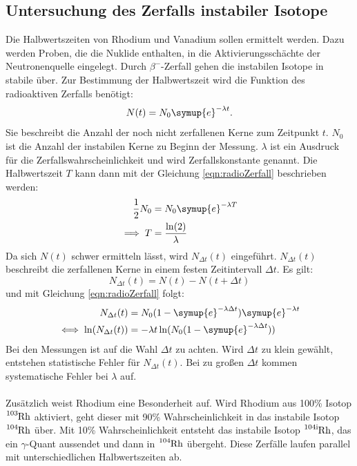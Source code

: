 \subsection{Untersuchung des Zerfalls instabiler Isotope}
Die Halbwertszeiten von Rhodium und Vanadium sollen ermittelt werden.
Dazu werden Proben, die die Nuklide enthalten, in die Aktivierungsschächte der Neutronenquelle eingelegt.
Durch $\beta^-$-Zerfall gehen die instabilen Isotope in stabile über.
Zur Bestimmung der Halbwertszeit wird die Funktion des radioaktiven Zerfalls benötigt:
\begin{equation}\label{eqn:radioZerfall}
    N(t) = N_0 \symup{e} ^{-\lambda t} .
\end{equation}
Sie beschreibt die Anzahl der noch nicht zerfallenen Kerne zum Zeitpunkt $t$.
$N_0$ ist die Anzahl der instabilen Kerne zu Beginn der Messung.
$\lambda$ ist ein Ausdruck für die Zerfallswahrscheinlichkeit und wird Zerfallskonstante genannt.
Die Halbwertszeit $T$ kann dann mit der Gleichung \eqref{eqn:radioZerfall} beschrieben werden:
\begin{align}
    \frac{1}{2} N_0 & = N_0 \symup{e}^{-\lambda T} \\* \label{eqn:halbwertszeit}
    \implies T & = \frac{\ln(2)}{\lambda} 
\end{align}
Da sich $N(t)$ schwer ermitteln lässt, wird $N_{\Delta t}(t)$ eingeführt.
$N_{\Delta t}(t)$ beschreibt die zerfallenen Kerne in einem festen Zeitintervall $\Delta t$.
Es gilt:
\begin{equation*}
    N_{\Delta t}(t) = N(t) - N(t + \Delta t)
\end{equation*}
und mit Gleichung \eqref{eqn:radioZerfall} folgt:
\begin{align*}
    N_{\Delta t}(t) & = N_0 (1 - \symup{e}^{-\lambda\Delta t}) \symup{e}^{-\lambda t}\\
    \iff \ln(N_{\Delta t}(t)) & = -\lambda t \ln(N_0(1 - \symup{e}^{-\lambda\Delta t}))
\end{align*}
Bei den Messungen ist auf die Wahl $\Delta t $ zu achten.
Wird $\Delta t $ zu klein gewählt, entstehen statistische Fehler für $N_{\Delta t}(t)$.
Bei zu großen $\Delta t$ kommen systematische Fehler bei $\lambda$ auf.\\
\\
Zusätzlich weist Rhodium eine Besonderheit auf.
Wird Rhodium aus 100\% Isotop $\ce{^{103}Rh}$ aktiviert, geht dieser mit 90\% Wahrscheinlichkeit in das instabile Isotop $\ce{^{104}Rh}$ über.
Mit 10\% Wahrscheinlichkeit entsteht das instabile Isotop $\ce{^{104\text{i}}Rh}$, das ein $\gamma$-Quant aussendet und dann in $\ce{^{104}Rh}$ übergeht.
Diese Zerfälle laufen parallel mit unterschiedlichen Halbwertszeiten ab.


